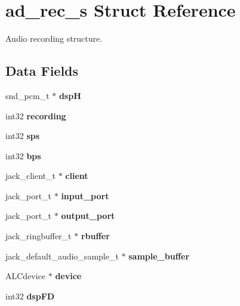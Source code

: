 \section{ad\-\_\-rec\-\_\-s Struct Reference}
\label{structad__rec__s}


Audio recording structure.  


\subsection*{Data Fields}
\begin{DoxyCompactItemize}
\item 
snd\-\_\-pcm\-\_\-t $\ast$ {\bfseries dsp\-H}\label{structad__rec__s_af4b2cd7de40e5b2a48d2d6878d33cc18}

\item 
int32 {\bfseries recording}\label{structad__rec__s_a5ddf90deb3806752a1fa3152fe864047}

\item 
int32 {\bfseries sps}\label{structad__rec__s_a2c5120af44acf19c5c7c63778bc932a3}

\item 
int32 {\bfseries bps}\label{structad__rec__s_a731523ef22607a580877bdcc563d9e5e}

\item 
jack\-\_\-client\-\_\-t $\ast$ {\bfseries client}\label{structad__rec__s_acd700500a367b0cb21306b7152f723af}

\item 
jack\-\_\-port\-\_\-t $\ast$ {\bfseries input\-\_\-port}\label{structad__rec__s_a3acb1e45a779726ee6370ee4f773ed12}

\item 
jack\-\_\-port\-\_\-t $\ast$ {\bfseries output\-\_\-port}\label{structad__rec__s_aa063dd1156101f957df117a0cd2407be}

\item 
jack\-\_\-ringbuffer\-\_\-t $\ast$ {\bfseries rbuffer}\label{structad__rec__s_a39c7bd9b729d4ec0da0bd2c9cfa5e240}

\item 
jack\-\_\-default\-\_\-audio\-\_\-sample\-\_\-t $\ast$ {\bfseries sample\-\_\-buffer}\label{structad__rec__s_a4118f000ae396de0faca9cbf07c2ee61}

\item 
A\-L\-Cdevice $\ast$ {\bfseries device}\label{structad__rec__s_a3e4378783effb06051461aca5a3d2f6c}

\item 
int32 {\bfseries dsp\-F\-D}\label{structad__rec__s_a7bd3eea2ed7b7be7155d4304505b140e}


\end{DoxyCompactItemize}
